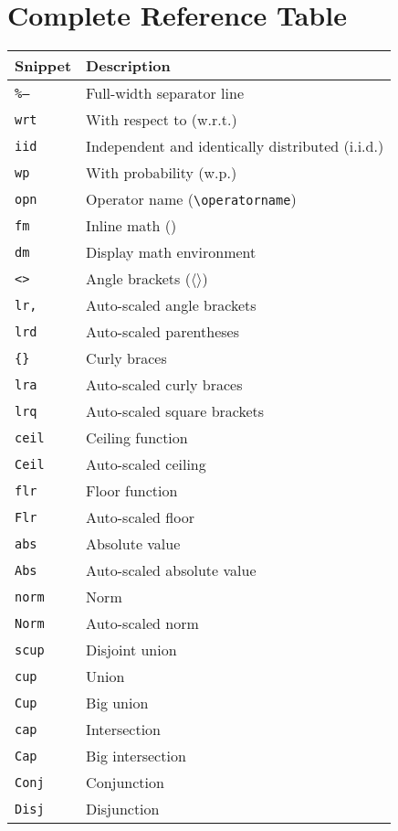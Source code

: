 \documentclass{article}
\newcommand{\snippet}[1]{\textcolor{titlebg}{\texttt{#1}}}
\begin{document}
\section{Complete Reference Table}
\begin{center}
\begin{tabularx}{\textwidth}{lY}
\textbf{Snippet} & \textbf{Description} \\
\hline
\snippet{\%--} & Full-width separator line \\
\snippet{wrt} & With respect to (w.r.t.) \\
\snippet{iid} & Independent and identically distributed (i.i.d.) \\
\snippet{wp} & With probability (w.p.) \\
\snippet{opn} & Operator name (\verb|\operatorname|) \\
\snippet{fm} & Inline math (\( \)) \\
\snippet{dm} & Display math environment \\
\snippet{<>} & Angle brackets ($\langle\rangle$) \\
\snippet{lr,} & Auto-scaled angle brackets \\
\snippet{lrd} & Auto-scaled parentheses \\
\snippet{\{\}} & Curly braces \\
\snippet{lra} & Auto-scaled curly braces \\
\snippet{lrq} & Auto-scaled square brackets \\
\snippet{ceil} & Ceiling function \\
\snippet{Ceil} & Auto-scaled ceiling \\
\snippet{flr} & Floor function \\
\snippet{Flr} & Auto-scaled floor \\
\snippet{abs} & Absolute value \\
\snippet{Abs} & Auto-scaled absolute value \\
\snippet{norm} & Norm \\
\snippet{Norm} & Auto-scaled norm \\
\snippet{scup} & Disjoint union \\
\snippet{cup} & Union \\
\snippet{Cup} & Big union \\
\snippet{cap} & Intersection \\
\snippet{Cap} & Big intersection \\
\snippet{Conj} & Conjunction \\
\snippet{Disj} & Disjunction \\

\end{tabularx}
\end{center}
\end{document}
